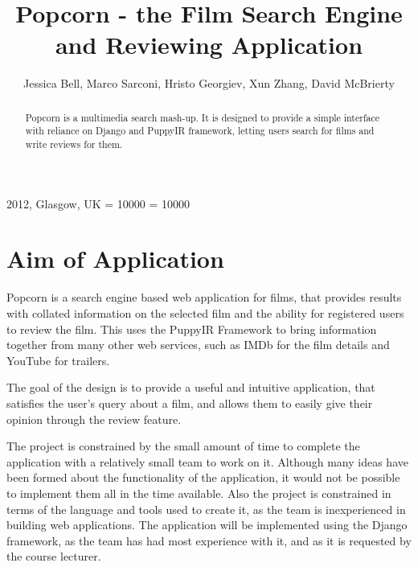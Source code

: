 \documentclass{sig-alt-release2}
\begin{document}
\newcommand{\todo}[1]{\textcolor{red}{#1}}
\def\newblock{\hskip .11em plus .33em minus .07em}

 {2012, Glasgow, UK} 
\clubpenalty = 10000
\widowpenalty = 10000

\title{Popcorn \-- the Film Search Engine and Reviewing Application}

\author{
\alignauthor
Jessica Bell, Marco Sarconi, Hristo Georgiev, Xun Zhang, David McBrierty\\
      \affaddr{}
}
\maketitle

\begin{abstract}
Popcorn is a multimedia search mash-up. It is designed to provide a simple interface with reliance on Django and PuppyIR framework, letting users search for films and write reviews for them.

\end{abstract}

\section{Aim of Application}
Popcorn is a search engine based web application for films, that provides results with collated information on the selected film and the ability for registered users to review the film. This uses the PuppyIR Framework \cite{puppyir} to bring information together from many other web services, such as IMDb \cite{imdb} for the film details and YouTube \cite{youtube} for trailers. 
 
The goal of the design is to provide a useful and intuitive application, that satisfies the user's query about a film, and allows them to easily give their opinion through the review feature. 
 
The project is constrained by the small amount of time to complete the application with a relatively small team to work on it. Although many ideas have been formed about the functionality of the application, it would not be possible to implement them all in the time available. Also the project is constrained in terms of the language and tools used to create it, as the team is inexperienced in building web applications. The application will be implemented using the Django framework, as the team has had most experience with it, and as it is requested by the course lecturer. 
 
\end{document}
